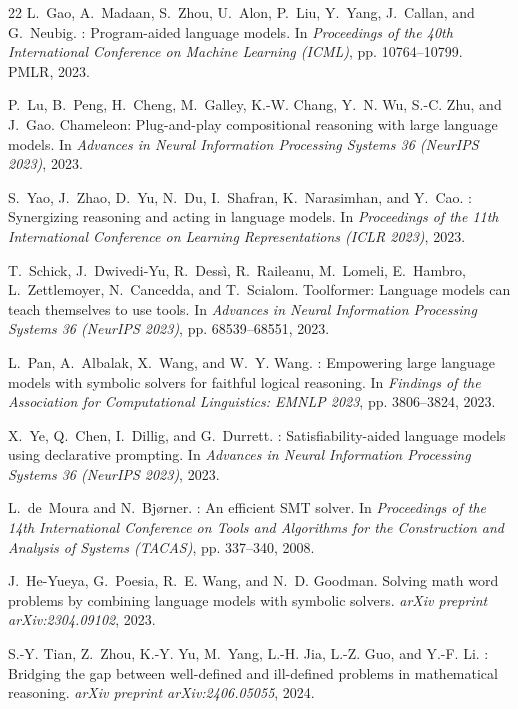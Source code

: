 \documentclass[sigconf, nonacm, onecolumn]{acmart}
\begin{document}
\begin{thebibliography}{22}
L.~Gao, A.~Madaan, S.~Zhou, U.~Alon, P.~Liu, Y.~Yang, J.~Callan, and
  G.~Neubig.
: Program-aided language models.
\newblock In \emph{Proceedings of the 40th International Conference on Machine
  Learning (ICML)}, pp. 10764--10799. PMLR, 2023.

P.~Lu, B.~Peng, H.~Cheng, M.~Galley, K.-W. Chang, Y.~N. Wu, S.-C. Zhu,
  and J.~Gao.
\newblock Chameleon: Plug-and-play compositional reasoning with large language
  models.
\newblock In \emph{Advances in Neural Information Processing Systems 36
  (NeurIPS 2023)}, 2023.

S.~Yao, J.~Zhao, D.~Yu, N.~Du, I.~Shafran, K.~Narasimhan, and Y.~Cao.
: Synergizing reasoning and acting in language models.
\newblock In \emph{Proceedings of the 11th International Conference on
  Learning Representations (ICLR 2023)}, 2023.

T.~Schick, J.~Dwivedi-Yu, R.~Dess\`{i}, R.~Raileanu, M.~Lomeli, E.~Hambro,
  L.~Zettlemoyer, N.~Cancedda, and T.~Scialom.
\newblock Toolformer: Language models can teach themselves to use tools.
\newblock In \emph{Advances in Neural Information Processing Systems 36
  (NeurIPS 2023)}, pp. 68539--68551, 2023.

L.~Pan, A.~Albalak, X.~Wang, and W.~Y. Wang.
: Empowering large language models with symbolic solvers
  for faithful logical reasoning.
\newblock In \emph{Findings of the Association for Computational Linguistics:
  EMNLP 2023}, pp. 3806--3824, 2023.

X.~Ye, Q.~Chen, I.~Dillig, and G.~Durrett.
: Satisfiability-aided language models using declarative
  prompting.
\newblock In \emph{Advances in Neural Information Processing Systems 36
  (NeurIPS 2023)}, 2023.

L.~de~Moura and N.~Bj{\o}rner.
: An efficient {SMT} solver.
\newblock In \emph{Proceedings of the 14th International Conference on Tools
  and Algorithms for the Construction and Analysis of Systems (TACAS)},
  pp. 337--340, 2008.

J.~He-Yueya, G.~Poesia, R.~E. Wang, and N.~D. Goodman.
\newblock Solving math word problems by combining language models with symbolic
  solvers.
\newblock \emph{arXiv preprint arXiv:2304.09102}, 2023.

S.-Y. Tian, Z.~Zhou, K.-Y. Yu, M.~Yang, L.-H. Jia, L.-Z. Guo, and Y.-F. Li.
: Bridging the gap between well-defined and ill-defined
  problems in mathematical reasoning.
\newblock \emph{arXiv preprint arXiv:2406.05055}, 2024.


\end{thebibliography}
\end{document}
